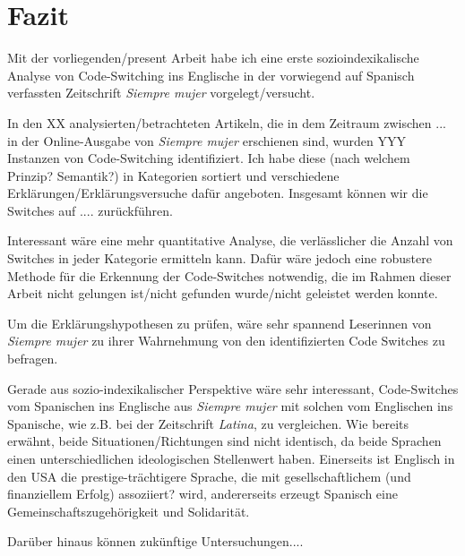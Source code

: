 \section{Fazit}
\label{chap:conclusion}

Mit der vorliegenden/present Arbeit habe ich eine erste sozioindexikalische Analyse von Code-Switching ins Englische in der vorwiegend auf Spanisch verfassten Zeitschrift \textit{Siempre mujer} vorgelegt/versucht.

In den XX analysierten/betrachteten Artikeln, die in dem Zeitraum zwischen ... in der Online-Ausgabe von \textit{Siempre mujer} erschienen sind, wurden YYY Instanzen von Code-Switching identifiziert.
Ich habe diese (nach welchem Prinzip? Semantik?) in Kategorien sortiert und verschiedene Erklärungen/Erklärungsversuche dafür angeboten.
Insgesamt können wir die Switches auf .... zurückführen.

Interessant wäre eine mehr quantitative Analyse, die verlässlicher die Anzahl von Switches in jeder Kategorie ermitteln kann.
Dafür wäre jedoch eine robustere Methode für die Erkennung der Code-Switches notwendig, die im Rahmen dieser Arbeit nicht gelungen ist/nicht gefunden wurde/nicht geleistet werden konnte.


Um die Erklärungshypothesen zu prüfen, wäre sehr spannend Leserinnen von \textit{Siempre mujer} zu ihrer Wahrnehmung von den identifizierten Code Switches zu befragen.

Gerade aus sozio-indexikalischer Perspektive wäre sehr interessant, Code-Switches vom Spanischen ins Englische aus \textit{Siempre mujer} mit solchen vom Englischen ins Spanische, wie z.B. bei der Zeitschrift \textit{Latina}, zu vergleichen.
Wie bereits erwähnt, beide Situationen/Richtungen sind nicht identisch, da beide Sprachen einen unterschiedlichen ideologischen Stellenwert haben.
Einerseits ist Englisch in den USA die prestige-trächtigere Sprache, die mit gesellschaftlichem (und finanziellem Erfolg) assoziiert? wird,
andererseits erzeugt Spanisch eine Gemeinschaftszugehörigkeit und Solidarität.

Darüber hinaus können zukünftige Untersuchungen....


